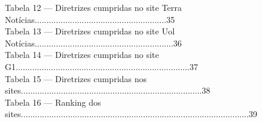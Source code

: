 \documentclass[a4paper]{article}
\begin{document}
\begin{titlepage}
	Tabela 12 — Diretrizes cumpridas no site Terra Notícias........................................................\hspace{0.2cm}35\\[0.5cm]
	Tabela 13 — Diretrizes cumpridas no site Uol Notícias...........................................................\hspace{0.2cm}36\\[0.5cm]
	Tabela 14 — Diretrizes cumpridas no site G1..........................................................................\hspace{0.2cm}37\\[0.5cm]
	Tabela 15 — Diretrizes cumpridas nos sites.............................................................................\hspace{0.2cm}38\\[0.5cm]
	Tabela 16 — Ranking dos sites.................................................................................................\hspace{0.2cm}39\\[0.5cm]
	
\end{titlepage}

\begin{titlepage}
	\begin{center}
		\tableofcontents
	\end{center}
\end{titlepage}
\end{document}

